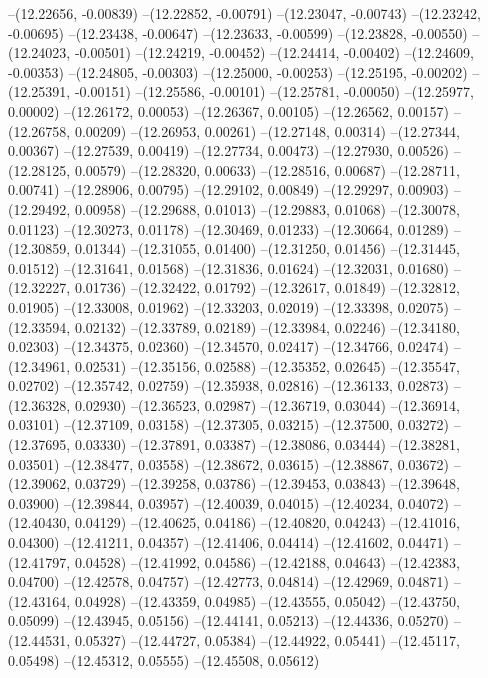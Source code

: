 --(12.22656, -0.00839)
--(12.22852, -0.00791)
--(12.23047, -0.00743)
--(12.23242, -0.00695)
--(12.23438, -0.00647)
--(12.23633, -0.00599)
--(12.23828, -0.00550)
--(12.24023, -0.00501)
--(12.24219, -0.00452)
--(12.24414, -0.00402)
--(12.24609, -0.00353)
--(12.24805, -0.00303)
--(12.25000, -0.00253)
--(12.25195, -0.00202)
--(12.25391, -0.00151)
--(12.25586, -0.00101)
--(12.25781, -0.00050)
--(12.25977, 0.00002)
--(12.26172, 0.00053)
--(12.26367, 0.00105)
--(12.26562, 0.00157)
--(12.26758, 0.00209)
--(12.26953, 0.00261)
--(12.27148, 0.00314)
--(12.27344, 0.00367)
--(12.27539, 0.00419)
--(12.27734, 0.00473)
--(12.27930, 0.00526)
--(12.28125, 0.00579)
--(12.28320, 0.00633)
--(12.28516, 0.00687)
--(12.28711, 0.00741)
--(12.28906, 0.00795)
--(12.29102, 0.00849)
--(12.29297, 0.00903)
--(12.29492, 0.00958)
--(12.29688, 0.01013)
--(12.29883, 0.01068)
--(12.30078, 0.01123)
--(12.30273, 0.01178)
--(12.30469, 0.01233)
--(12.30664, 0.01289)
--(12.30859, 0.01344)
--(12.31055, 0.01400)
--(12.31250, 0.01456)
--(12.31445, 0.01512)
--(12.31641, 0.01568)
--(12.31836, 0.01624)
--(12.32031, 0.01680)
--(12.32227, 0.01736)
--(12.32422, 0.01792)
--(12.32617, 0.01849)
--(12.32812, 0.01905)
--(12.33008, 0.01962)
--(12.33203, 0.02019)
--(12.33398, 0.02075)
--(12.33594, 0.02132)
--(12.33789, 0.02189)
--(12.33984, 0.02246)
--(12.34180, 0.02303)
--(12.34375, 0.02360)
--(12.34570, 0.02417)
--(12.34766, 0.02474)
--(12.34961, 0.02531)
--(12.35156, 0.02588)
--(12.35352, 0.02645)
--(12.35547, 0.02702)
--(12.35742, 0.02759)
--(12.35938, 0.02816)
--(12.36133, 0.02873)
--(12.36328, 0.02930)
--(12.36523, 0.02987)
--(12.36719, 0.03044)
--(12.36914, 0.03101)
--(12.37109, 0.03158)
--(12.37305, 0.03215)
--(12.37500, 0.03272)
--(12.37695, 0.03330)
--(12.37891, 0.03387)
--(12.38086, 0.03444)
--(12.38281, 0.03501)
--(12.38477, 0.03558)
--(12.38672, 0.03615)
--(12.38867, 0.03672)
--(12.39062, 0.03729)
--(12.39258, 0.03786)
--(12.39453, 0.03843)
--(12.39648, 0.03900)
--(12.39844, 0.03957)
--(12.40039, 0.04015)
--(12.40234, 0.04072)
--(12.40430, 0.04129)
--(12.40625, 0.04186)
--(12.40820, 0.04243)
--(12.41016, 0.04300)
--(12.41211, 0.04357)
--(12.41406, 0.04414)
--(12.41602, 0.04471)
--(12.41797, 0.04528)
--(12.41992, 0.04586)
--(12.42188, 0.04643)
--(12.42383, 0.04700)
--(12.42578, 0.04757)
--(12.42773, 0.04814)
--(12.42969, 0.04871)
--(12.43164, 0.04928)
--(12.43359, 0.04985)
--(12.43555, 0.05042)
--(12.43750, 0.05099)
--(12.43945, 0.05156)
--(12.44141, 0.05213)
--(12.44336, 0.05270)
--(12.44531, 0.05327)
--(12.44727, 0.05384)
--(12.44922, 0.05441)
--(12.45117, 0.05498)
--(12.45312, 0.05555)
--(12.45508, 0.05612)
